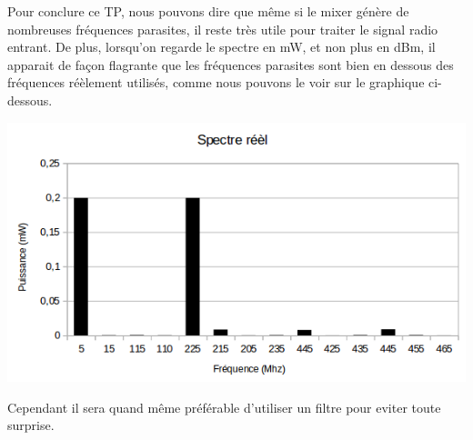 \documentclass[a4paper,12pt]{report}            %
\begin{document}
    Pour conclure ce TP, nous pouvons dire que même si le mixer génère de nombreuses fréquences parasites, 
il reste très utile pour traiter le signal radio entrant. De plus, lorsqu'on regarde le spectre en mW, et non plus
en dBm, il apparait de façon flagrante que les fréquences parasites sont bien en dessous des fréquences
réèlement utilisés, comme nous pouvons le voir sur le graphique ci-dessous. 
\begin{center}\includegraphics[scale = 0.7]{pic/spectre_mw.png}\\ \end{center}
Cependant il sera quand même préférable d'utiliser un filtre pour eviter toute surprise.
\end{document}
